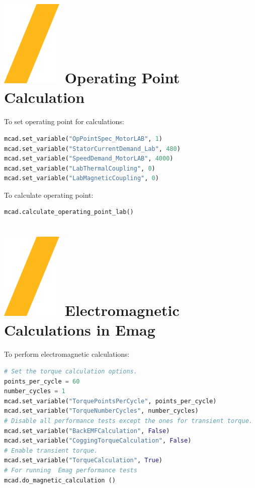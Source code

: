 \documentclass[landscape]{article}
\begin{document}
\begin{multicols}{3}
\section{\includegraphics[height=\fontcharht\font`\S]{slash.png} Operating Point Calculation}
 To set operating point for calculations:
\begin{lstlisting}[language=Python]
mcad.set_variable("OpPointSpec_MotorLAB", 1)
mcad.set_variable("StatorCurrentDemand_Lab", 480)
mcad.set_variable("SpeedDemand_MotorLAB", 4000)
mcad.set_variable("LabThermalCoupling", 0)
mcad.set_variable("LabMagneticCoupling", 0)
\end{lstlisting}
To calculate operating point:
\begin{lstlisting}[language=Python]
mcad.calculate_operating_point_lab()
\end{lstlisting}
\section{\includegraphics[height=\fontcharht\font`\S]{slash.png} Electromagnetic Calculations in Emag}
To perform electromagnetic calculations:
\begin{lstlisting}[language=Python]
# Set the torque calculation options.
points_per_cycle = 60 
number_cycles = 1
mcad.set_variable("TorquePointsPerCycle", points_per_cycle)
mcad.set_variable("TorqueNumberCycles", number_cycles)
# Disable all performance tests except the ones for transient torque.
mcad.set_variable("BackEMFCalculation", False)
mcad.set_variable("CoggingTorqueCalculation", False)
# Enable transient torque.
mcad.set_variable("TorqueCalculation", True)
# For running  Emag performance tests
mcad.do_magnetic_calculation ()
\end{lstlisting}



\end{multicols}
\end{document}
